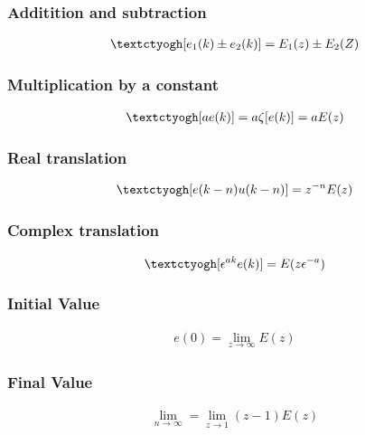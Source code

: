 \documentclass{article}
\begin{document}
\subsubsection{Additition and subtraction}
\begin{align*}
	\text{\textctyogh}[e_1(k) \pm e_2(k)] = E_1(z) \pm E_2(Z)\\
\end{align*}
\subsubsection{Multiplication by a constant}
\begin{align*}
	\text{\textctyogh}[ae(k)] = a\zeta[e(k)] = aE(z)\\
\end{align*}
\subsubsection{Real translation}
\begin{align*}
	\text{\textctyogh}[e(k-n)u(k-n)] = z^{-n} E(z)\\
\end{align*}
\subsubsection{Complex translation}
\begin{align*}
	\text{\textctyogh}[\epsilon^{ak}e(k)] = E(z\epsilon^{-a})
\end{align*}
\subsubsection{Initial Value}
\begin{align*}
	e(0) = \lim_{z \to \infty}E(z)
\end{align*}
\subsubsection{Final Value}
\begin{align*}
	\lim_{n \to \infty} = \lim_{z \to 1}(z-1)E(z)
\end{align*}



\end{document}
